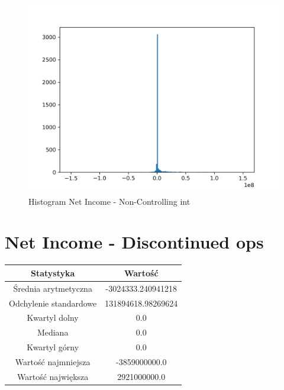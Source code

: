 \documentclass{article}
\begin{document}
\begin{figure}[h!]
    \includegraphics[width=\linewidth]{variables/Net Income - Non-Controlling int.png}
    \caption{Histogram Net Income - Non-Controlling int }
\end{figure}\section{ Net Income - Discontinued ops }

\begin{center}
    \begin{tabular}{|c | c|} 
    \hline
    Statystyka & Wartość \\
    \hline\hline
    Średnia arytmetyczna & -3024333.240941218 \\ 
    \hline
    Odchylenie standardowe & 131894618.98269624 \\
    \hline
    Kwartyl dolny & 0.0 \\
    \hline
    Mediana & 0.0 \\
    \hline
    Kwartyl górny & 0.0 \\
    \hline
    Wartość najmniejsza & -3859000000.0 \\
    \hline
    Wartość największa & 2921000000.0 \\
    \hline
   \end{tabular}
\end{center}
\end{document}
